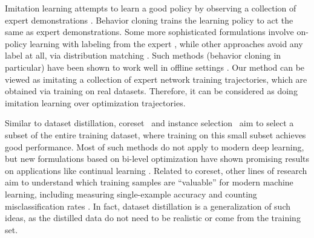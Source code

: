 \documentclass[main.tex]{subfiles}
\begin{document}
Imitation learning attempts to learn a good policy by observing a collection of expert demonstrations \cite{osa2018algorithmic,peng2018deepmimic,peng2021amp}. Behavior cloning trains the learning policy to act the same as expert demonstrations. Some more sophisticated formulations involve on-policy learning with labeling from the expert \cite{ross2011reduction}, while other approaches avoid any label at all, \eg via distribution matching
\cite{ho2016generative}. Such methods (behavior cloning in particular) have been shown to work well in offline settings \cite{fu2020d4rl,gulcehre2020rl}. 
Our method can be viewed as imitating a collection of expert network training trajectories, which are obtained via training on real datasets. Therefore, it can be considered as doing imitation learning over optimization trajectories.

Similar to dataset distillation, coreset~\cite{tsang2005core,har2007smaller,bachem2017practical,sener2018active,chen2010super} and instance selection~\cite{olvera2010review} aim to select a subset of the entire training dataset, where training on this small subset achieves good performance. Most of such methods do not apply to modern deep learning, but new formulations based on bi-level optimization have shown promising results on applications like continual learning \cite{borsos2020coresets}. Related to coreset, other lines of research aim to understand which training samples are    ``valuable'' for modern machine learning, including measuring single-example accuracy \citep{lapedriza2013all} and counting misclassification rates \citep{toneva2018empirical}. In fact, dataset distillation is a generalization of such ideas, as the distilled data do not need to be realistic or come from the training set.
\end{document}
